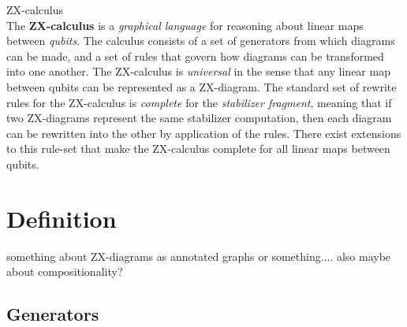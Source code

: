 \documentclass[a4paper, 12pt]{article}
\begin{document}
{\Huge ZX-calculus} \\

The \textbf{ZX-calculus} is a \emph{graphical language} for reasoning about linear maps between \emph{qubits}. The calculus consists of a set of generators from which diagrams can be made, and a set of rules that govern how diagrams can be transformed into one another. The ZX-calculus is \emph{universal} in the sense that any linear map between qubits can be represented as a ZX-diagram. The standard set of rewrite rules for the ZX-calculus is \emph{complete} for the \emph{stabilizer fragment}, meaning that if two ZX-diagrams represent the same stabilizer computation, then each diagram can be rewritten into the other by application of the rules. There exist extensions to this rule-set that make the ZX-calculus complete for all linear maps between qubits.



\section{Definition}

something about ZX-diagrams as annotated graphs or something....
also maybe about compositionality?

\subsection{Generators}
\end{document}
